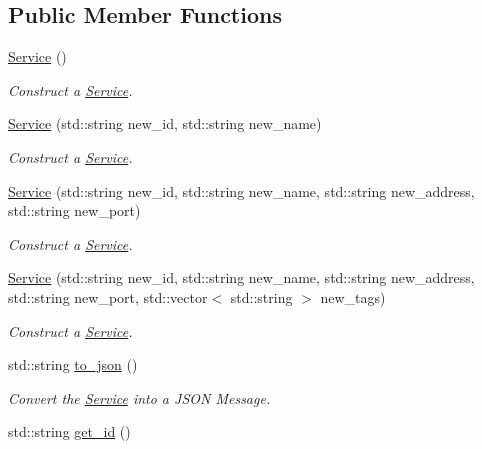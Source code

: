 \subsection*{Public Member Functions}
\begin{DoxyCompactItemize}
\item 
\hypertarget{classService_acc246c9f7ed3c51e2d91d10fe257513f}{\hyperlink{classService_acc246c9f7ed3c51e2d91d10fe257513f}{Service} ()}\label{classService_acc246c9f7ed3c51e2d91d10fe257513f}

\begin{DoxyCompactList}\small\item\em Construct a \hyperlink{classService}{Service}. \end{DoxyCompactList}\item 
\hypertarget{classService_a5a2c138cda796995fd96f4d72961627e}{\hyperlink{classService_a5a2c138cda796995fd96f4d72961627e}{Service} (std\-::string new\-\_\-id, std\-::string new\-\_\-name)}\label{classService_a5a2c138cda796995fd96f4d72961627e}

\begin{DoxyCompactList}\small\item\em Construct a \hyperlink{classService}{Service}. \end{DoxyCompactList}\item 
\hypertarget{classService_a7fcbb48bac14e340ae490120dff8bc98}{\hyperlink{classService_a7fcbb48bac14e340ae490120dff8bc98}{Service} (std\-::string new\-\_\-id, std\-::string new\-\_\-name, std\-::string new\-\_\-address, std\-::string new\-\_\-port)}\label{classService_a7fcbb48bac14e340ae490120dff8bc98}

\begin{DoxyCompactList}\small\item\em Construct a \hyperlink{classService}{Service}. \end{DoxyCompactList}\item 
\hypertarget{classService_a3f17f6c4a5f8fd51034379e9dcae6d2c}{\hyperlink{classService_a3f17f6c4a5f8fd51034379e9dcae6d2c}{Service} (std\-::string new\-\_\-id, std\-::string new\-\_\-name, std\-::string new\-\_\-address, std\-::string new\-\_\-port, std\-::vector$<$ std\-::string $>$ new\-\_\-tags)}\label{classService_a3f17f6c4a5f8fd51034379e9dcae6d2c}

\begin{DoxyCompactList}\small\item\em Construct a \hyperlink{classService}{Service}. \end{DoxyCompactList}\item 
std\-::string \hyperlink{classService_a4a9e3ab8b1e7c82a7f624022906410f4}{to\-\_\-json} ()
\begin{DoxyCompactList}\small\item\em Convert the \hyperlink{classService}{Service} into a J\-S\-O\-N Message. \end{DoxyCompactList}\item 
\hypertarget{classService_adefcc615297a9cd243767f699468edb7}{std\-::string \hyperlink{classService_adefcc615297a9cd243767f699468edb7}{get\-\_\-id} ()}\label{classService_adefcc615297a9cd243767f699468edb7}


\end{DoxyCompactItemize}
